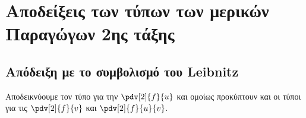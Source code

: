 \documentclass[a4paper,table]{report}
\begin{document}
  \pagebreak

  \section{Αποδείξεις των τύπων των μερικών Παραγώγων 2ης τάξης}

  \subsection{Απόδειξη με το συμβολισμό του Leibnitz}

  Αποδεικνύουμε τον τύπο για την $ \pdv[2]{f}{u} $ και ομοίως προκύπτουν και οι τύποι 
  για τις $ \pdv[2]{f}{v}  $ και $ \pdv[2]{f}{u}{v} $.

  \vspace{\baselineskip}

  \twocolumnsideslc
\end{document}
